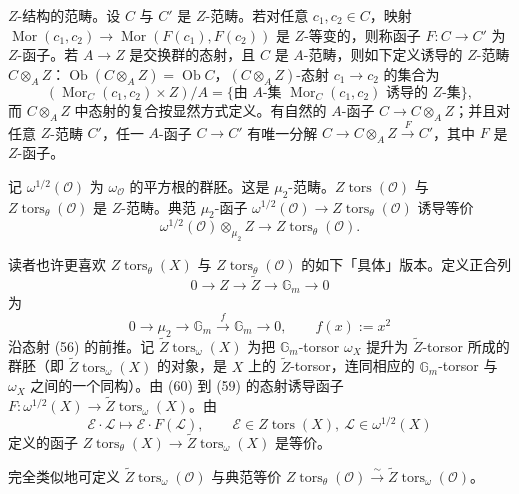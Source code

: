 $Z$-结构的范畴。设 $C$ 与 $C'$ 是 $Z$-范畴。若对任意 $c_{1},c_{2}\in C$，映射 $\operatorname{Mor}(c_{1},c_{2})\to\operatorname{Mor}(F(c_{1}),F(c_{2}))$ 是 $Z$-等变的，则称函子 $F:C\to C'$ 为 $Z$-函子。若 $A\to Z$ 是交换群的态射，且 $C$ 是 $A$-范畴，则如下定义诱导的 $Z$-范畴 $C\otimes_{A}Z$：$\operatorname{Ob}(C\otimes_{A}Z)=\operatorname{Ob}C$，$(C\otimes_{A}Z)$-态射 $c_{1}\to c_{2}$ 的集合为
\[
  (\operatorname{Mor}_{C}(c_{1},c_{2})\times Z)/A
  =\{\text{由 }A\text{-集 }\operatorname{Mor}_{C}(c_{1},c_{2})\text{ 诱导的 }Z\text{-集}\},
\]
而 $C\otimes_{A}Z$ 中态射的复合按显然方式定义。有自然的 $A$-函子 $C\to C\otimes_{A}Z$；并且对任意 $Z$-范畴 $C'$，任一 $A$-函子 $C\to C'$ 有唯一分解 $C\to C\otimes_{A}Z\xrightarrow{F}C'$，其中 $F$ 是 $Z$-函子。

记 $\omega^{1/2}(\mathcal{O})$ 为 $\omega_{\mathcal{O}}$ 的平方根的群胚。这是 $\mu_{2}$-范畴。$Z\operatorname{tors}(\mathcal{O})$ 与 $Z\operatorname{tors}_{\theta}(\mathcal{O})$ 是 $Z$-范畴。典范 $\mu_{2}$-函子 $\omega^{1/2}(\mathcal{O})\to Z\operatorname{tors}_{\theta}(\mathcal{O})$ 诱导等价
\[
  \omega^{1/2}(\mathcal{O})\otimes_{\mu_{2}}Z\to Z\operatorname{tors}_{\theta}(\mathcal{O}).
\]

 读者也许更喜欢 $Z\operatorname{tors}_{\theta}(X)$ 与 $Z\operatorname{tors}_{\theta}(\mathcal{O})$ 的如下「具体」版本。定义正合列
\begin{equation}\tag{59}
  0\to Z\to\widetilde{Z}\to\mathbb{G}_{m}\to 0
\end{equation}
为
\begin{equation}\tag{60}
  0\to\mu_{2}\to\mathbb{G}_{m}\xrightarrow{f}\mathbb{G}_{m}\to 0,\qquad f(x):=x^{2}
\end{equation}
沿态射 (56) 的前推。记 $\widetilde{Z}\operatorname{tors}_{\omega}(X)$ 为把 $\mathbb{G}_{m}$-torsor $\omega_{X}$ 提升为 $\widetilde{Z}$-torsor 所成的群胚（即 $\widetilde{Z}\operatorname{tors}_{\omega}(X)$ 的对象，是 $X$ 上的 $\widetilde{Z}$-torsor，连同相应的 $\mathbb{G}_{m}$-torsor 与 $\omega_{X}$ 之间的一个同构）。由 (60) 到 (59) 的态射诱导函子 $F:\omega^{1/2}(X)\to\widetilde{Z}\operatorname{tors}_{\omega}(X)$。由
\[
  \mathcal{E}\cdot\mathcal{L}\mapsto\mathcal{E}\cdot F(\mathcal{L}),\qquad
  \mathcal{E}\in Z\operatorname{tors}(X),\ \mathcal{L}\in\omega^{1/2}(X)
\]
定义的函子 $Z\operatorname{tors}_{\theta}(X)\to\widetilde{Z}\operatorname{tors}_{\omega}(X)$ 是等价。

完全类似地可定义 $\widetilde{Z}\operatorname{tors}_{\omega}(\mathcal{O})$ 与典范等价 $Z\operatorname{tors}_{\theta}(\mathcal{O})\xrightarrow{\sim}\widetilde{Z}\operatorname{tors}_{\omega}(\mathcal{O})$。

